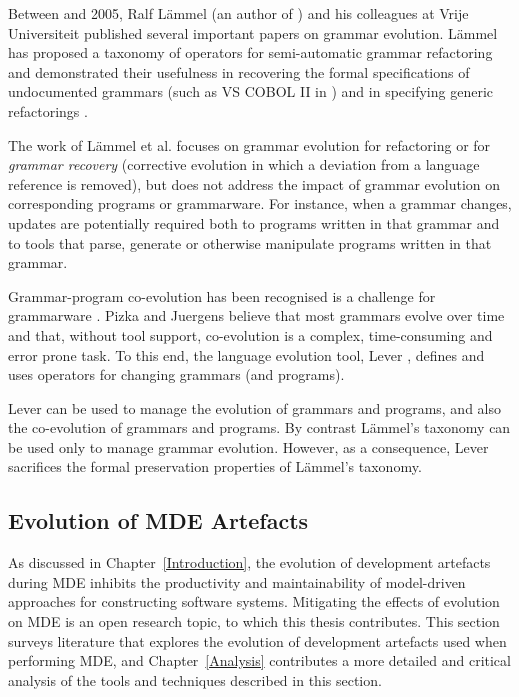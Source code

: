 Between  and 2005, Ralf L\"{a}mmel (an author of \cite{klint03grammarware}) and his colleagues at Vrije Universiteit published several important papers on grammar evolution. L\"{a}mmel has proposed a taxonomy of operators for semi-automatic grammar refactoring \cite{lammel01grammar_adaptation} and demonstrated their usefulness in recovering the formal specifications of undocumented grammars (such as VS COBOL II in \cite{lammel01semiautomatic}) and in specifying generic refactorings \cite{lammel02towards}. 

The work of L\"{a}mmel et al. focuses on grammar evolution for refactoring or for \emph{grammar recovery} (corrective evolution in which a deviation from a language reference is removed), but does not address the impact of grammar evolution on corresponding programs or grammarware. For instance, when a grammar changes, updates are potentially required both to programs written in that grammar and to tools that parse, generate or otherwise manipulate programs written in that grammar.

Gr\-am\-mar-program co-evolution has been recognised is a challenge for grammarware \cite{pizka07automating}. Pizka and Juergens believe that most grammars evolve over time and that, without tool support, co-evolution is a complex, time-consuming and error prone task. To this end, the language evolution tool, Lever \cite{pizka07automating}, defines and uses operators for changing grammars (and programs).

Lever \cc can be used to manage the evolution of grammars and programs, and also the co-evolution of grammars and programs. By contrast L\"{a}mmel's taxonomy \cite{lammel01grammar_adaptation} can be used only to manage grammar evolution. However, as a consequence, Lever sacrifices the formal preservation properties of L\"{a}mmel's taxonomy.


\subsection{Evolution of MDE Artefacts}
\label{subsec:mde_evo}
As discussed in Chapter~\ref{Introduction}, the evolution of development artefacts during MDE inhibits the productivity and maintainability of model-driven approaches for constructing software systems. Mitigating the effects of evolution on MDE is an open research topic, to which this thesis contributes. This section surveys literature that explores the evolution of development artefacts used when performing MDE, and Chapter~\ref{Analysis} contributes a more detailed and critical analysis of the tools and techniques described in this section.

